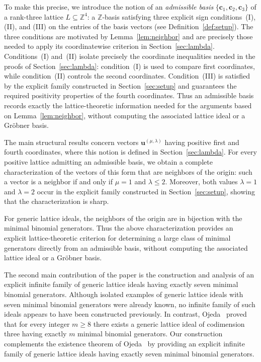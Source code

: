 \documentclass[12pt,a4paper]{amsart}
\theoremstyle{definition}
\begin{document}
To make this precise, we introduce the notion of an \emph{admissible
basis} $\{\mathbf c_1,\mathbf c_2,\mathbf c_3\}$ of a rank-three
lattice $L\subseteq\mathbb Z^4$: a $\mathbb Z$-basis satisfying three
explicit sign conditions~\textup{(I)}, \textup{(II)}, and
\textup{(III)} on the entries of the basis vectors
(see Definition~\ref{def:setup}).
The three conditions are motivated by Lemma~\ref{lem:neighbor} and are
precisely those needed to apply its coordinatewise criterion in
Section~\ref{sec:lambda}. Conditions~\textup{(I)} and~\textup{(II)}
isolate precisely the coordinate inequalities needed in the proofs of
Section~\ref{sec:lambda}: condition~\textup{(I)} is used to compare
first coordinates, while condition~\textup{(II)} controls the second
coordinates. Condition~\textup{(III)} is satisfied by the explicit
family constructed in Section~\ref{sec:setup} and guarantees the
required positivity properties of the fourth coordinates. Thus an
admissible basis records exactly the lattice-theoretic information
needed for the arguments based on Lemma~\ref{lem:neighbor}, without
computing the associated lattice ideal or a Gröbner basis.

The main structural results concern vectors
$\mathbf u^{(\mu,\lambda)}$
having positive first and fourth coordinates,
where this notion is defined in
Section~\ref{sec:lambda}.
For every positive lattice admitting an admissible basis, we obtain a
complete characterization of the vectors of this form that are
neighbors of the origin: such a vector is a neighbor if and only if
$\mu=1$ and $\lambda\le2$.
Moreover, both values
$\lambda=1$ and $\lambda=2$
occur in the explicit family constructed in
Section~\ref{sec:setup}, showing that the characterization is sharp.

For generic lattice ideals, the neighbors of the origin are in
bijection with the minimal binomial generators.
Thus the above characterization provides an explicit
lattice-theoretic criterion for determining a large class of minimal
generators directly from an admissible basis, without computing the
associated lattice ideal or a Gr\"obner basis.

The second main contribution of the paper is the construction and
analysis of an explicit infinite family of generic lattice ideals
having exactly seven minimal binomial generators.
Although isolated examples of generic lattice ideals with seven minimal
binomial generators were already known, no infinite family of such
ideals appears to have been constructed previously.
In contrast, Ojeda~\cite{Ojeda} proved that for every integer
$m\ge8$ there exists a generic lattice ideal of codimension three
having exactly $m$ minimal binomial generators.
Our construction complements the existence theorem of
Ojeda~\cite{Ojeda} by providing an explicit infinite family of generic
lattice ideals having exactly seven minimal binomial generators.
\end{document}
